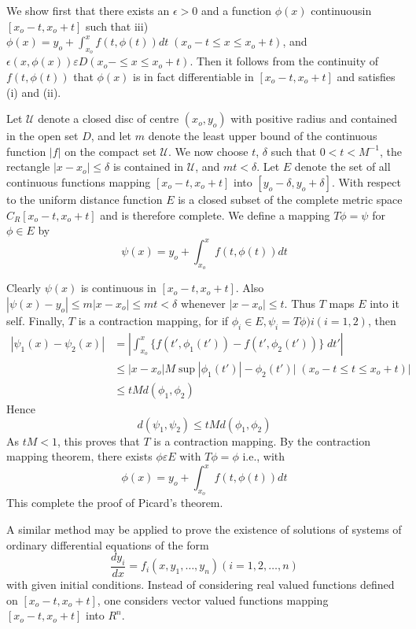 We show first that there exists an $\epsilon > 0$ and a function $\phi (x)$
continuous\pageoriginale in $[x_o - t, x_o + t]$ such that iii) $\phi
(x) = y_o + 
\int_{x_o}^{x} f (t, \phi (t)) dt \; (x_o - t \leq x \leq x_o +t)$, and
$\epsilon (x, \phi (x)) \varepsilon D (x_o - \leq x \leq x_o + t)$. Then it
follows from the continuity of $f(t, \phi (t))$ that $\phi(x)$ is
in fact  differentiable in $[x_o - t, x_o + t]$ and satisfies (i)
and (ii). 

Let $\mathcal{U}$ denote a closed disc of centre $(x_o, y_o)$ with
positive radius and contained in the open set $D$, and let $m$ denote
the least upper bound of the continuous function $|f|$ on the compact
set $\mathcal{U}$. We now choose $t$, $\delta$ such that $0 < t <
M^{-1}$, the rectangle $|x-x_o| \leq \delta$ is contained  in
$\mathcal{U}$, and $m t < \delta$. Let $E$ denote the set of all
continuous functions mapping $[x_o - t, x_o + t]$ into $[y_o- \delta,
  y_o + \delta]$. With respect to the uniform distance function $E$ is
a  closed subset of the complete metric  space $C_R [x_o - t , x_o+t]$
and is therefore complete. We define a mapping $T \phi = \psi $ for
$\phi \in E$ by 
$$
\psi (x) = y_o + \int_{x_{o}}^{x} f(t,\phi (t))dt
$$ 

Clearly $\psi (x)$ is continuous in $[x_o -t, x_o + t]$. Also $|\psi
(x) - y_o| \leq m |x-x_o|\leq m t < \delta$ whenever $|x-x_o |\leq
t$. Thus $T$ maps $E$ into it self. Finally, $T$ is a contraction
mapping, for if $\phi _i \in E, \psi _i = T \phi)i (i=1,2)$, then 
\begin{align*}
  |\psi _1 (x)- \psi_2 (x)| & = |\int_{x_{o}}^{x} \bigg\{ f (t', \phi_1
  (t')) - f (t', \phi_2 (t'))\bigg \} \; dt' |\\
  & \leq |x- x_o| M \sup|\phi_1
  (t')| - \phi_2(t') | \; (x_o - t \leq t \leq x_o + t)|\\ 
  & \leq t M d (\phi_1, \phi_2)
\end{align*}
Hence\pageoriginale 
$$
d (\psi_1, \psi_2) \leq t M d (\phi_1, \phi_2)
$$
As $t M < 1$, this proves that $T$ is a contraction mapping. By the
contraction mapping theorem, there exists $\phi \varepsilon E$ with $T \phi =
\phi$ i.e., with 
$$
\phi (x) = y_o + \int_{x_{o}}^{x} f (t, \phi(t)) dt
$$
This complete the proof of Picard's theorem.  

A similar method may be applied to prove the existence of solutions of
systems of ordinary differential equations of the form 
$$
\frac{dy_i}{dx}= f_i (x,y_1, \ldots , y_n) (i=1, 2, \ldots, n)
$$
with given initial conditions. Instead of considering real valued
functions defined on $[x_o - t , x_o +t]$, one considers vector valued
functions mapping $[x_o - t, x_o +t]$ into $R^n$. 

